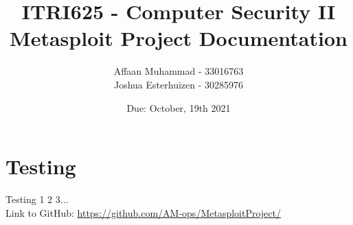 \documentclass[a4paper, 12pt, titlepage]{report}
\begin{document}
\linespread{1.5}
\author{Affaan Muhammad - 33016763\\Joshua Esterhuizen - 30285976}
\title{ITRI625 - Computer Security II\\Metasploit Project Documentation}
\date{Due: October, 19th 2021}
\maketitle
\tableofcontents{}
\chapter{Testing}
Testing 1 2 3... \cite{wm}\\
Link to GitHub: \url{https://github.com/AM-ops/MetasploitProject/}
\printbibliography[heading=bibintoc]
\end{document}
